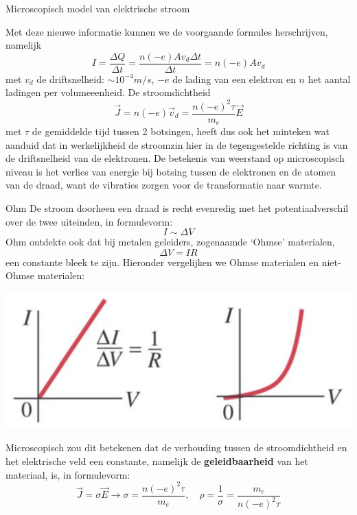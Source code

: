 \begin{app}{Microscopisch model van elektrische stroom}
\begin{center}
    \end{center}
    Met deze nieuwe informatie kunnen we de voorgaande formules herschrijven, namelijk
    \begin{equation*}
        I = \dfrac{\Delta Q}{\Delta t} = \dfrac{n(-e)Av_d\Delta t}{\Delta t} = n(-e)Av_d
    \end{equation*}
    met $v_d$ de driftsnelheid: $\sim 10^{-4} m/s$, $-e$ de lading van een elektron en $n$ het aantal ladingen per volumeeenheid. De stroomdichtheid
    \begin{equation*}
        \Vec{J} = n(-e)\Vec{v}_d = \dfrac{n(-e)^2\tau}{m_e}\Vec{E}
    \end{equation*}
    met $\tau$ de gemiddelde tijd tussen 2 botsingen, heeft dus ook het minteken wat aanduid dat in werkelijkheid de stroomzin hier in de tegengestelde richting is van de driftsnelheid van de elektronen. De betekenis van weerstand op microscopisch niveau is het verlies van energie bij botsing tussen de elektronen en de atomen van de draad, want de vibraties zorgen voor de transformatie naar warmte.
\end{app}

\newpage

\begin{lem}[Ohm]{Ohm}
    De stroom doorheen een draad is recht evenredig met het potentiaalverschil over de twee uiteinden, in formulevorm:
    \begin{equation*}
         I \sim \Delta V
    \end{equation*}
    Ohm ontdekte ook dat bij metalen geleiders, zogenaamde `Ohmse' materialen,
    \begin{equation*}
         \Delta V= IR 
    \end{equation*}
    een constante bleek te zijn. Hieronder vergelijken we Ohmse materialen en niet-Ohmse materialen:
    \begin{center}
        \includegraphics[scale = 0.2]{Images/Elektriciteit/GrafiekOhmseMaterialen.png}
    \end{center}
    Microscopisch zou dit betekenen dat de verhouding tussen de stroomdichtheid en het elektrische veld een constante, namelijk de \textbf{geleidbaarheid} van het materiaal, is, in formulevorm: 
    \begin{equation*}
        \Vec{J} = \sigma \Vec{E} \rightarrow \sigma = \dfrac{n(-e)^2\tau}{m_e}, \quad \rho = \dfrac{1}{\sigma} = \dfrac{m_e}{n(-e)^2\tau}
    \end{equation*}
\end{lem}

